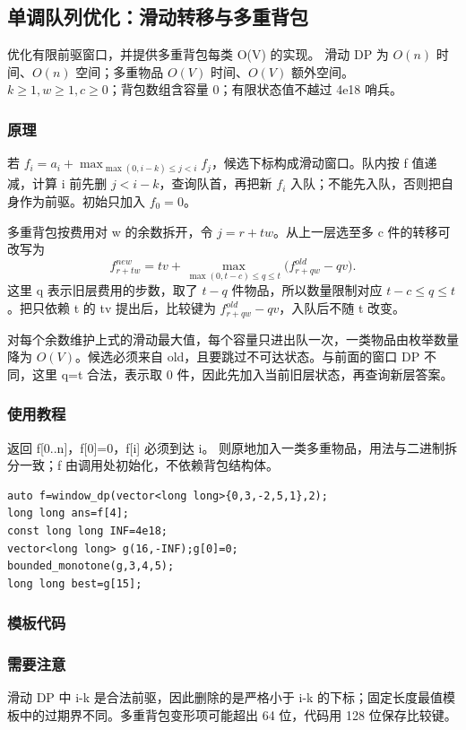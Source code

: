 \subsection{单调队列优化：滑动转移与多重背包}
\label{dp:queue-optimization}
\AlgorithmInfo
    {优化有限前驱窗口，并提供多重背包每类 O(V) 的实现。}
    {滑动 DP 为 $O(n)$ 时间、$O(n)$ 空间；多重物品 $O(V)$ 时间、$O(V)$ 额外空间。}
    {$k\ge1,w\ge1,c\ge0$；背包数组含容量 0；有限状态值不越过 4e18 哨兵。}
\subsubsection*{原理}

若 $f_i=a_i+\max_{\max(0,i-k)\le j<i}f_j$，候选下标构成滑动窗口。队内按 f 值递减，计算 i 前先删 $j<i-k$，查询队首，再把新 $f_i$ 入队；不能先入队，否则把自身作为前驱。初始只加入 $f_0=0$。

多重背包按费用对 w 的余数拆开，令 $j=r+tw$。从上一层选至多 c 件的转移可改写为
\[
 f^{new}_{r+tw}=tv+\max_{\max(0,t-c)\le q\le t}
 \bigl(f^{old}_{r+qw}-qv\bigr).
\]
这里 q 表示旧层费用的步数，取了 $t-q$ 件物品，所以数量限制对应 $t-c\le q\le t$。把只依赖 t 的 tv 提出后，比较键为 $f^{old}_{r+qw}-qv$，入队后不随 t 改变。

对每个余数维护上式的滑动最大值，每个容量只进出队一次，一类物品由枚举数量降为 $O(V)$。候选必须来自 old，且要跳过不可达状态。与前面的窗口 DP 不同，这里 q=t 合法，表示取 0 件，因此先加入当前旧层状态，再查询新层答案。

\subsubsection*{使用教程}
 返回 f[0..n]，f[0]=0，f[i] 必须到达 i。 则原地加入一类多重物品，用法与二进制拆分一致；f 由调用处初始化，不依赖背包结构体。
\begin{lstlisting}[style=mtycpp,numbers=none]
auto f=window_dp(vector<long long>{0,3,-2,5,1},2);
long long ans=f[4];
const long long INF=4e18;
vector<long long> g(16,-INF);g[0]=0;
bounded_monotone(g,3,4,5);
long long best=g[15];
\end{lstlisting}
\subsubsection*{模板代码}
\subsubsection*{需要注意}
滑动 DP 中 i-k 是合法前驱，因此删除的是严格小于 i-k 的下标；固定长度最值模板中的过期界不同。多重背包变形项可能超出 64 位，代码用 128 位保存比较键。
